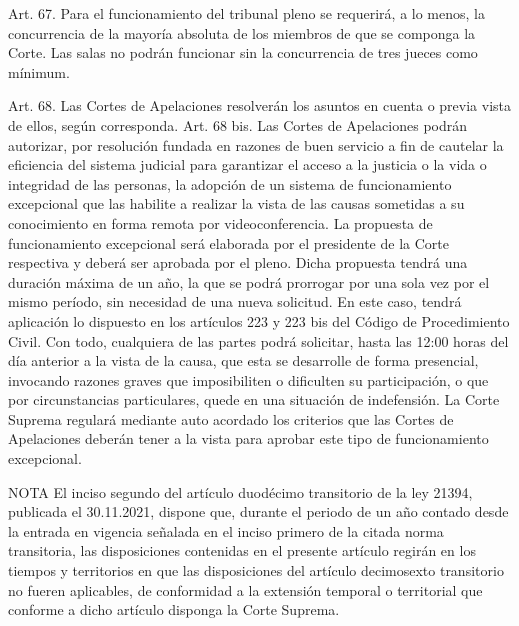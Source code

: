     Art. 67. Para el funcionamiento del tribunal pleno se requerirá, a lo menos, la concurrencia de la mayoría absoluta de los miembros de que se componga la Corte.
    Las salas no podrán funcionar sin la concurrencia de tres jueces como mínimum.


    Art. 68. Las Cortes de Apelaciones resolverán los asuntos en cuenta o previa vista de ellos, según corresponda.
    Art. 68 bis. Las Cortes de Apelaciones podrán autorizar, por resolución fundada en razones de buen servicio a fin de cautelar la eficiencia del sistema judicial para garantizar el acceso a la justicia o la vida o integridad de las personas, la adopción de un sistema de funcionamiento excepcional que las habilite a realizar la vista de las causas sometidas a su conocimiento en forma remota por videoconferencia. La propuesta de funcionamiento excepcional será elaborada por el presidente de la Corte respectiva y deberá ser aprobada por el pleno. Dicha propuesta tendrá una duración máxima de un año, la que se podrá prorrogar por una sola vez por el mismo período, sin necesidad de una nueva solicitud.
    En este caso, tendrá aplicación lo dispuesto en los artículos 223 y 223 bis del Código de Procedimiento Civil.
    Con todo, cualquiera de las partes podrá solicitar, hasta las 12:00 horas del día anterior a la vista de la causa, que esta se desarrolle de forma presencial, invocando razones graves que imposibiliten o dificulten su participación, o que por circunstancias particulares, quede en una situación de indefensión.
    La Corte Suprema regulará mediante auto acordado los criterios que las Cortes de Apelaciones deberán tener a la vista para aprobar este tipo de funcionamiento excepcional.



NOTA
      El inciso segundo del artículo duodécimo transitorio de la ley 21394, publicada el 30.11.2021, dispone que, durante el periodo de un año contado desde la entrada en vigencia señalada en el inciso primero de la citada norma transitoria, las disposiciones contenidas en el presente artículo regirán en los tiempos y territorios en que las disposiciones del artículo decimosexto transitorio no fueren aplicables, de conformidad a la extensión temporal o territorial que conforme a dicho artículo disponga la Corte Suprema.

